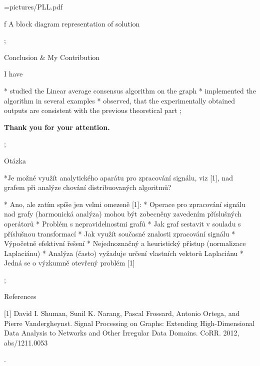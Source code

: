 \centerline{\picw=\hsize \inspic pictures/PLL.pdf } 
\caption/f A block diagram representation of solution

\pg;








\sec Conclusion \& My Contribution

I have 

* studied the Linear average consensus algorithm on the graph 
* implemented the  algorithm in  several examples
* observed, that the experimentally obtained outputs are consistent with the previous theoretical part
\pg;

\null
\vskip2cm
\centerline{\typosize[35/40]\bf Thank you for your attention.}\pg;



\sec  Otázka

*Je možné využít analytického aparátu pro zpracování signálu, viz [1],  \nl   nad grafem při
analýze chování distribuovaných algoritmů?

* Ano, ale zatím spíše jen velmi omezeně [1]: 
\begitems
* Operace pro zpracování signálu nad grafy (harmonická analýza) mohou být zobecněny zavedením příslušných operátorů
* Problém s nepravidelnostmi grafů
\begitems
* Jak graf sestavit v souladu s příslušnou transformací
* Jak využít současné znalosti zpracování signálu
* Výpočetně efektivní řešení 
\enditems
* Nejednoznačný a heuristický přístup (normalizace Laplaciánu)
* Analýza (často) vyžaduje určení vlastních vektorů Laplaciánu
\enditems
* Jedná se o výzkumně otevřený problém [1]

\pg;

\sec References

 [1] David I. Shuman, Sunil K. Narang, Pascal Frossard, Antonio Ortega, and Pierre
Vandergheynst. Signal Processing on Graphs: Extending High-Dimensional
Data Analysis to Networks and Other Irregular Data Domains. CoRR. 2012,
abs/1211.0053 


\pg. %

